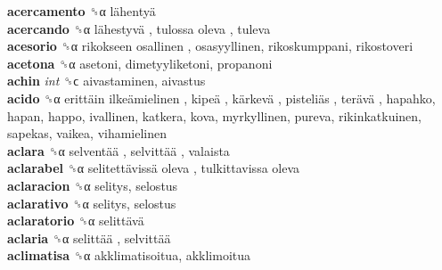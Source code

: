 \textbf{acercamento} ␝α   lähentyä   \\
\textbf{acercando} ␝α   lähestyvä ,  tulossa oleva , tuleva  \\
\textbf{acesorio} ␝α   rikokseen osallinen , osasyyllinen, rikoskumppani, rikostoveri  \\
\textbf{acetona} ␝α  asetoni, dimetyyliketoni, propanoni  \\
\textbf{achin} \emph{int}  ␝ϲ  aivastaminen, aivastus  \\
\textbf{acido} ␝α   erittäin ilkeämielinen ,  kipeä ,  kärkevä ,  pisteliäs ,  terävä , hapahko, hapan, happo, ivallinen, katkera, kova, myrkyllinen, pureva, rikinkatkuinen, sapekas, vaikea, vihamielinen  \\
\textbf{aclara} ␝α   selventää ,  selvittää , valaista  \\
\textbf{aclarabel} ␝α   selitettävissä oleva ,  tulkittavissa oleva   \\
\textbf{aclaracion} ␝α  selitys, selostus  \\
\textbf{aclarativo} ␝α  selitys, selostus  \\
\textbf{aclaratorio} ␝α   selittävä   \\
\textbf{aclaria} ␝α   selittää ,  selvittää   \\
\textbf{aclimatisa} ␝α  akklimatisoitua, akklimoitua  \\
